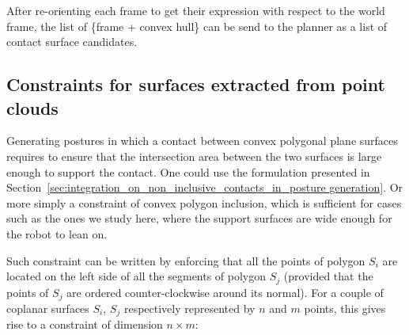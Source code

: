 After re-orienting each frame to get their expression with respect to the world frame, the list of \{frame + convex hull\} can be send to the planner as a list of contact surface candidates.



\subsection{Constraints for surfaces extracted from point clouds}

Generating postures in which a contact between convex polygonal plane surfaces requires to ensure that the intersection area between the two surfaces is large enough to support the contact.
One could use the formulation presented in Section~\ref{sec:integration_on_non_inclusive_contacts_in_posture generation}.
Or more simply a constraint of convex polygon inclusion, which is sufficient for cases such as the ones we study here, where the support surfaces are wide enough for the robot to lean on.


Such constraint can be written by enforcing that all the points of polygon $S_i$ are located on the left side of all the segments of polygon $S_j$ (provided that the points of $S_j$ are ordered counter-clockwise around its normal).
For a couple of coplanar surfaces $S_i$, $S_j$ respectively represented by $n$ and $m$ points, this gives rise to a constraint of dimension $n \times m$:

